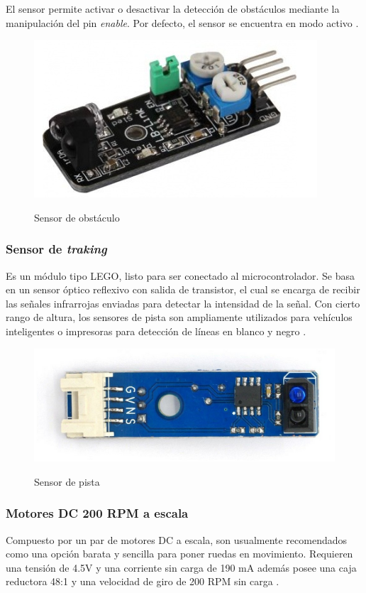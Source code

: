 El sensor permite activar o desactivar la detección de obstáculos mediante la manipulación del pin \textit{enable}. Por defecto, el sensor se encuentra en modo activo \cite{obstaculo}.

\begin{figure}[H]
    \centering
    \includegraphics[width = 7 cm]{imagenes/obstacle.PNG}
    \caption{Sensor de obstáculo}
    \cite{obstaculo}
\end{figure}

\subsubsection{Sensor de \textit{traking}}
Es un módulo tipo LEGO, listo para ser conectado al microcontrolador. Se basa en un sensor óptico reflexivo con salida de transistor, el cual se encarga de recibir las señales infrarrojas enviadas para detectar la intensidad de la señal. Con cierto rango de altura, los sensores de pista son ampliamente utilizados para vehículos inteligentes o impresoras para detección de líneas en blanco y negro \cite{track}.

\begin{figure}[H]
    \centering
    \includegraphics[width = 7 cm]{imagenes/tracking.png}
    \caption{Sensor de pista}
    \cite{track}
\end{figure}


\subsubsection{Motores DC 200 RPM a escala}
Compuesto por un par de motores DC a escala, son usualmente recomendados como una opción barata y sencilla para poner ruedas en movimiento. Requieren una tensión de 4.5V y una corriente sin carga de 190 mA además posee una caja reductora 48:1 y una velocidad de giro de 200 RPM sin carga \cite{motor_dc}.

